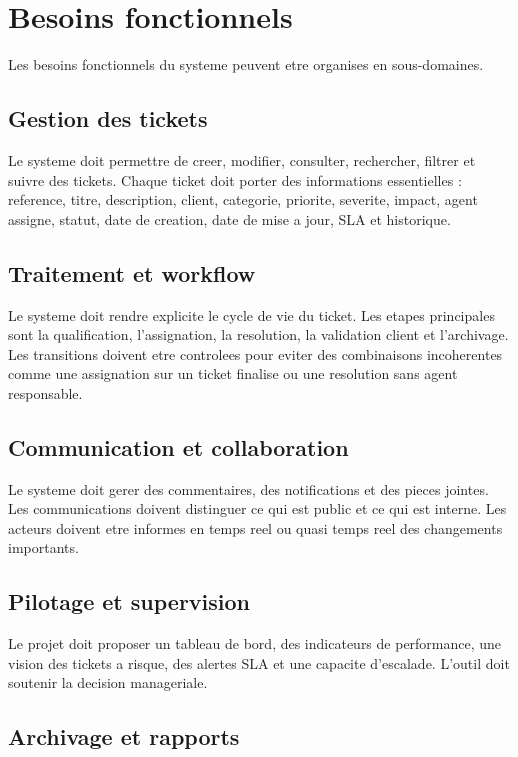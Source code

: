 \section{Besoins fonctionnels}

Les besoins fonctionnels du systeme peuvent etre organises en sous-domaines.

\subsection{Gestion des tickets}

Le systeme doit permettre de creer, modifier, consulter, rechercher, filtrer et suivre des tickets. Chaque ticket doit porter des informations essentielles : reference, titre, description, client, categorie, priorite, severite, impact, agent assigne, statut, date de creation, date de mise a jour, SLA et historique.

\subsection{Traitement et workflow}

Le systeme doit rendre explicite le cycle de vie du ticket. Les etapes principales sont la qualification, l'assignation, la resolution, la validation client et l'archivage. Les transitions doivent etre controlees pour eviter des combinaisons incoherentes comme une assignation sur un ticket finalise ou une resolution sans agent responsable.

\subsection{Communication et collaboration}

Le systeme doit gerer des commentaires, des notifications et des pieces jointes. Les communications doivent distinguer ce qui est public et ce qui est interne. Les acteurs doivent etre informes en temps reel ou quasi temps reel des changements importants.

\subsection{Pilotage et supervision}

Le projet doit proposer un tableau de bord, des indicateurs de performance, une vision des tickets a risque, des alertes SLA et une capacite d'escalade. L'outil doit soutenir la decision manageriale.

\subsection{Archivage et rapports}

